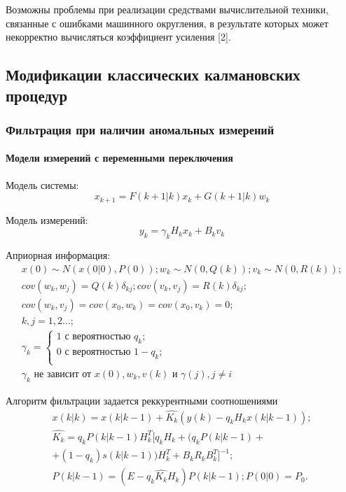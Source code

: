 \documentclass[a4paper,12pt]{article}
\begin{document}
Возможны проблемы при реализации средствами вычислительной техники, связанные с
ошибками машинного округления, в результате которых может некорректно
вычисляться коэффициент усиления [2].

\subsection{Модификации классических калмановских процедур}

\subsubsection{Фильтрация при наличии аномальных измерений}

\paragraph{Модели измерений с переменными переключения\\}

Модель системы:
\[ x_{k+1} = F(k+1|k) x_k + G(k+1|k) w_k \]

Модель измерений:
\[ y_k = \gamma_k H_k x_k + B_k v_k \]

Априорная информация:
\[ 	
\begin{array}{l}
	x(0) \sim N(x(0|0), P(0)); w_k \sim N(0, Q(k)); v_k \sim N(0, R(k)); \\
	cov(w_k, w_j) = Q(k)\delta_{kj}; cov(v_k, v_j) = R(k)\delta_{kj}; \\
	cov(w_k, v_j) = cov(x_0, w_k) = cov(x_0, v_k) = 0; \\
	k, j = 1, 2\ldots; \\
	\gamma_k = 
	\left\{ 
		\begin{array}{lr}
			1 \mbox{ с вероятностью } q_k; \\
			0 \mbox{ с вероятностью } 1-q_k; \\
		\end{array}
	\right. \\
	\mbox{$\gamma_k$ не зависит от $x(0), w_k, v(k)$ и $\gamma(j), j \ne i $}
\end{array}
\]

Алгоритм фильтрации задается реккурентными соотношениями
\[
	\begin{array}{l}
	x(k|k) = x(k|k-1) + \hat{K_k}(y(k) - q_k H_k x(k|k-1)); \\
	\hat{K_k} = q_k P(k|k-1) H^T_k [ q_k H_k + (q_k P(k|k-1) + \\
		 + (1 - q_k) s(k|k-1)) H^T_k + B_k R_k B^T_k ]^{-1}; \\
	P(k|k-1) = (E - q_k \hat{K_k} H_k) P(k|k-1); P(0|0) = P_0 .
	\end{array}
\]
\end{document}
